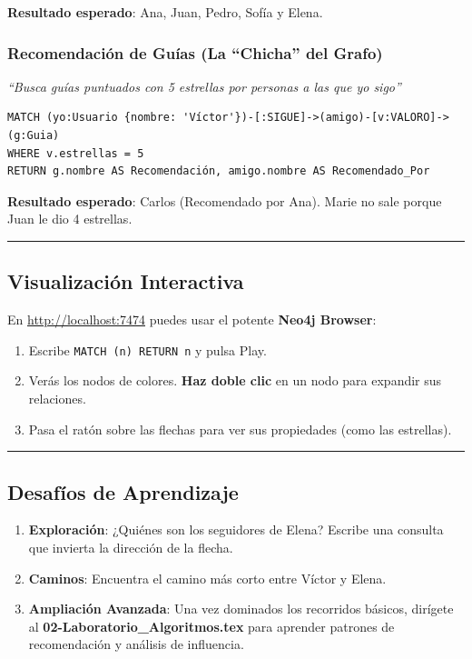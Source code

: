 \documentclass[12pt,a4paper]{article}
\begin{document}
\textbf{Resultado esperado}: Ana, Juan, Pedro, Sofía y Elena.

\subsubsection{Recomendación de Guías (La \enquote{Chicha} del Grafo)}\label{d.-recomendaciuxf3n-de-guuxedas-la-chicha-del-grafo}

\emph{\enquote{Busca guías puntuados con 5 estrellas por personas a las que yo sigo}}

\begin{lstlisting}
MATCH (yo:Usuario {nombre: 'Víctor'})-[:SIGUE]->(amigo)-[v:VALORO]->(g:Guia)
WHERE v.estrellas = 5
RETURN g.nombre AS Recomendación, amigo.nombre AS Recomendado_Por
\end{lstlisting}

\textbf{Resultado esperado}: Carlos (Recomendado por Ana). Marie no sale porque Juan le dio 4 estrellas.

\begin{center}\rule{0.5\linewidth}{0.5pt}\end{center}

\subsection{Visualización Interactiva}\label{visualizaciuxf3n-interactiva}

En \url{http://localhost:7474} puedes usar el potente \textbf{Neo4j Browser}:
\begin{enumerate}
    \item Escribe \texttt{MATCH (n) RETURN n} y pulsa Play.
    \item Verás los nodos de colores. \textbf{Haz doble clic} en un nodo para expandir sus relaciones.
    \item Pasa el ratón sobre las flechas para ver sus propiedades (como las estrellas).
\end{enumerate}

\begin{center}\rule{0.5\linewidth}{0.5pt}\end{center}

\subsection{Desafíos de Aprendizaje}\label{desafios}

\begin{enumerate}
    \item \textbf{Exploración}: ¿Quiénes son los seguidores de Elena? Escribe una consulta que invierta la dirección de la flecha.
    \item \textbf{Caminos}: Encuentra el camino más corto entre Víctor y Elena.
    \item \textbf{Ampliación Avanzada}: Una vez dominados los recorridos básicos, dirígete al \textbf{02-Laboratorio\_Algoritmos.tex} para aprender patrones de recomendación y análisis de influencia.
\end{enumerate}
\end{document}
